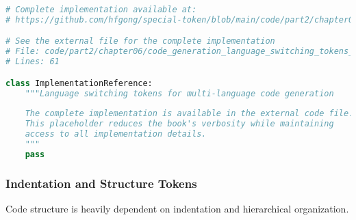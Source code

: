 \begin{lstlisting}[language=Python, caption={Language switching tokens for multi-language code generation}]
# Complete implementation available at:
# https://github.com/hfgong/special-token/blob/main/code/part2/chapter06/code_generation_language_switching_tokens_for_.py

# See the external file for the complete implementation
# File: code/part2/chapter06/code_generation_language_switching_tokens_for_.py
# Lines: 61

class ImplementationReference:
    """Language switching tokens for multi-language code generation
    
    The complete implementation is available in the external code file.
    This placeholder reduces the book's verbosity while maintaining
    access to all implementation details.
    """
    pass
\end{lstlisting}

\subsubsection{Indentation and Structure Tokens}

Code structure is heavily dependent on indentation and hierarchical organization.
\begin{comment}
Feedback: Before the code, it's helpful to explain *why* these tokens are so important for code. For example: "In many languages like Python, whitespace (indentation) is syntactically meaningful. A standard tokenizer would discard this information. By introducing explicit `<INDENT>` and `<DEDENT>` tokens, the model can treat structure as part of the sequence it learns from, allowing it to understand and generate correctly formatted code blocks, loops, and functions. This transforms invisible structure into a visible signal for the transformer."
\end{comment}

